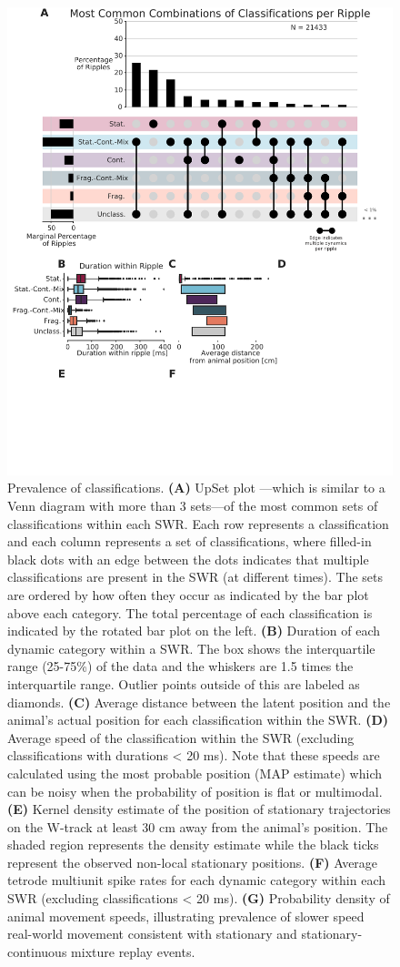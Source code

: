 \documentclass[9pt,lineno]{elife}
\begin{document}
\begin{figure}
\includegraphics[width=0.80\linewidth]{figures/Figure5/Figure5_final}
\caption{
Prevalence of classifications. \textbf{(A)} UpSet plot \citep{LexUpSetVisualizationIntersecting2014}---which is similar to a Venn diagram with more than 3 sets---of the most common sets of classifications within each SWR. Each row represents a classification and each column represents a set of classifications, where filled-in black dots with an edge between the dots indicates that multiple classifications are present in the SWR (at different times). The sets are ordered by how often they occur as indicated by the bar plot above each category. The total percentage of each classification is indicated by the rotated bar plot on the left. \textbf{(B)} Duration of each dynamic category within a SWR. The box shows the interquartile range (25-75\%) of the data and the whiskers are 1.5 times the interquartile range. Outlier points outside of this are labeled as diamonds. \textbf{(C)} Average distance between the latent position and the animal's actual position for each classification within the SWR. \textbf{(D)} Average speed of the classification within the SWR (excluding classifications with durations < 20 ms). Note that these speeds are calculated using the most probable position (MAP estimate) which can be noisy when the probability of position is flat or multimodal.\textbf{(E)} Kernel density estimate of the position of stationary trajectories on the W-track at least 30 cm away from the animal's position. The shaded region represents the density estimate while the black ticks represent the observed non-local stationary positions. \textbf{(F)} Average tetrode multiunit spike rates for each dynamic category within each SWR (excluding classifications < 20 ms). \textbf{(G)} Probability density of animal movement speeds, illustrating prevalence of slower speed real-world movement consistent with stationary and stationary-continuous mixture replay events. 
}
\label{fig:5}


\end{figure}
\end{document}
